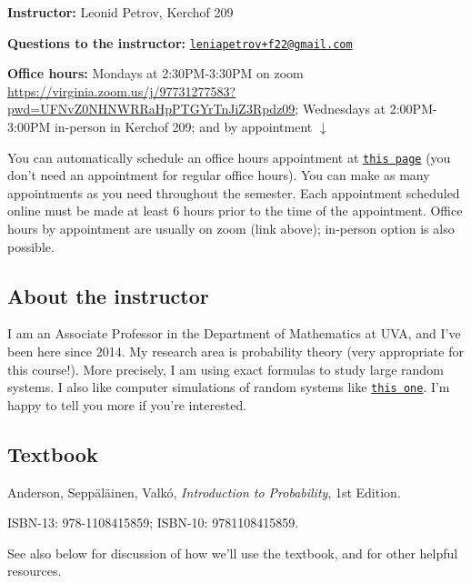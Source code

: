 \documentclass[oneside,11pt]{amsart}
\begin{document}
\bigskip

\textbf{Instructor:} Leonid Petrov, Kerchof 209

\textbf{Questions to the instructor:} \href{mailto:leniapetrov+f22@gmail.com}{\texttt{leniapetrov+f22@gmail.com}}

	\textbf{Office hours:} 
	Mondays at 2:30PM-3:30PM on zoom
	\url{https://virginia.zoom.us/j/97731277583?pwd=UFNvZ0NHNWRRaHpPTGYrTnJiZ3Rpdz09};
	Wednesdays at 2:00PM-3:00PM in-person in Kerchof 209; and by appointment $\downarrow$
	
	You can automatically schedule an office hours appointment 
	at \href{https://lpetrov.cc/teaching/}{\texttt{this page}} (you don't need an appointment for 
	regular office hours).
	You can make as many appointments as you need throughout the semester.
	Each appointment scheduled online
	must be made at least 6 hours prior to the time of the appointment.
	Office hours by appointment are usually on zoom (link above); 
	in-person option is also possible.
	
\subsection{About the instructor}
I am an Associate Professor in the Department of Mathematics at UVA, and I've
been here since 2014. My research area is probability theory (very appropriate
for this course!). More precisely, I am using exact formulas to study large
random systems. I also like computer simulations of random systems like 
\href{https://d3m0khvr0ybm92.cloudfront.net/img/blog/heart/UVA_colors_small.png}{\texttt{this one}}.
I'm happy to tell you more if you're
interested.

\subsection{Textbook}
\label{sub:main_textbook}

Anderson, Sepp\"al\"ainen, Valk\'o, \emph{Introduction to Probability}, 1st Edition.

ISBN-13: 978-1108415859; 
ISBN-10: 9781108415859.

See also  below for discussion 
of how we'll use the textbook,
and for other helpful resources.
\end{document}
